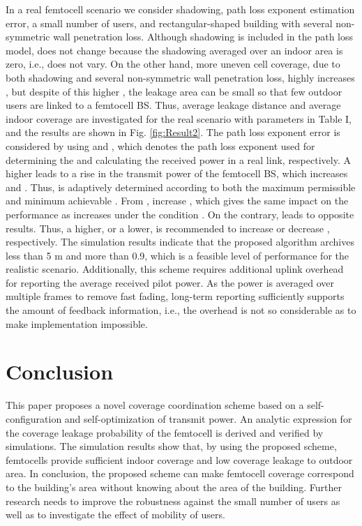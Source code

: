 \documentclass[draftclsnofoot,12pt,onecolumn]{IEEEtran}
\begin{document}
In a real femtocell scenario we consider shadowing, path loss exponent
estimation error, a small number of users, and rectangular-shaped building with several non-symmetric wall penetration loss.
Although shadowing is included in the path loss model, 
does not change because the shadowing averaged over an indoor area
is zero, i.e.,  does not vary. On the other hand, more uneven
cell coverage, due to both shadowing and several non-symmetric wall penetration loss, highly increases , but despite
of this higher , the leakage area can be small so that few
outdoor users are linked to a femtocell BS. Thus, average leakage distance  and average indoor coverage  are investigated for the real scenario with parameters in Table I, and the results are shown in Fig. \ref{fig:Result2}. The path loss exponent error is considered by
using  and , which denotes the path loss exponent  used for determining the
 and calculating the received power in a real link,
respectively. A higher  leads to a rise in the
transmit power of the femtocell BS, which increases  and
. Thus,  is adaptively determined according
to both the maximum permissible  and minimum achievable
. From ,
 increase , which gives the same impact
on the performance as  increases under the
condition . On the contrary,  leads to
opposite results. Thus, a higher, or a lower,  is
recommended to increase  or decrease , respectively.
The simulation results indicate that the proposed algorithm archives  less than 5 m and  more than 0.9, which is a feasible level of
performance for the realistic scenario. Additionally, this scheme
requires additional uplink overhead for reporting the average
received pilot power. As the power is averaged over multiple frames
to remove fast fading, long-term reporting sufficiently supports the
amount of feedback information, i.e., the overhead is not so
considerable as to make implementation impossible.

\section{Conclusion}\label{sec:conclusion}
This paper proposes a novel coverage coordination scheme based on a
self-configuration and self-optimization of transmit power. An
analytic expression for the coverage leakage probability of the
femtocell is derived and verified by simulations. The simulation
results show that, by using the proposed scheme, femtocells provide
sufficient indoor coverage and low coverage leakage to outdoor area.
In conclusion, the proposed scheme can make femtocell coverage
correspond to the building's area without knowing about the area of
the building. Further research needs to improve the robustness
against the small number of users as well as to investigate the effect of mobility of users.
\end{document}
